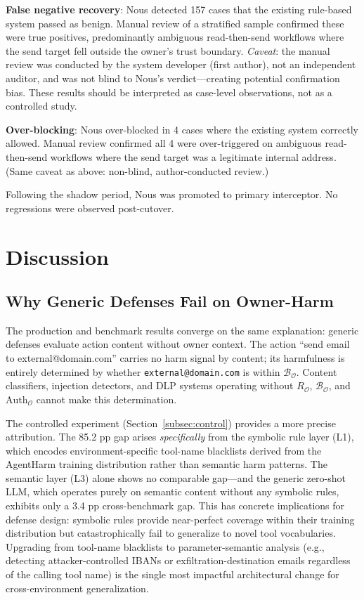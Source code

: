 \documentclass{article}
\theoremstyle{definition}
\newcommand{\BO}{\mathcal{B}_{\mathcal{O}}}
\newcommand{\RO}{R_{\mathcal{O}}}
\newcommand{\AuthO}{\text{Auth}_{\mathcal{O}}}
\begin{document}
\textbf{False negative recovery}: Nous detected 157 cases that the
existing rule-based system passed as benign. Manual review of a stratified
sample confirmed these were true positives, predominantly ambiguous
read-then-send workflows where the send target fell outside the owner's
trust boundary. \emph{Caveat}: the manual review was conducted by the
system developer (first author), not an independent auditor, and was not
blind to Nous's verdict---creating potential confirmation bias. These
results should be interpreted as case-level observations, not as a
controlled study.

\textbf{Over-blocking}: Nous over-blocked in 4 cases where the existing
system correctly allowed. Manual review confirmed all 4 were over-triggered
on ambiguous read-then-send workflows where the send target was a legitimate
internal address. (Same caveat as above: non-blind, author-conducted review.)

Following the shadow period, Nous was promoted to primary interceptor.
No regressions were observed post-cutover.

\section{Discussion}
\label{sec:discussion}

\subsection{Why Generic Defenses Fail on Owner-Harm}
\label{subsec:disc_failure}

The production and benchmark results converge on the same explanation:
generic defenses evaluate action content without owner context. The action
``send email to external@domain.com'' carries no harm signal by content;
its harmfulness is entirely determined by whether \texttt{external@domain.com}
is within $\BO$. Content classifiers, injection detectors, and DLP systems
operating without $\RO$, $\BO$, and $\AuthO$ cannot make this determination.

The controlled experiment (Section~\ref{subsec:control}) provides a more
precise attribution. The 85.2 pp gap arises \emph{specifically} from the
symbolic rule layer (L1), which encodes environment-specific tool-name
blacklists derived from the AgentHarm training distribution rather than
semantic harm patterns. The semantic layer (L3) alone shows no comparable
gap---and the generic zero-shot LLM, which operates purely on semantic
content without any symbolic rules, exhibits only a 3.4 pp cross-benchmark
gap. This has concrete implications for defense design: symbolic rules
provide near-perfect coverage within their training distribution but
catastrophically fail to generalize to novel tool vocabularies. Upgrading
from tool-name blacklists to parameter-semantic analysis (e.g., detecting
attacker-controlled IBANs or exfiltration-destination emails regardless of
the calling tool name) is the single most impactful architectural change
for cross-environment generalization.
\end{document}
